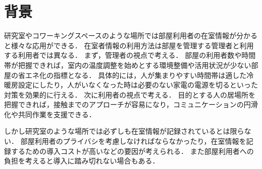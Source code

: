 





\section{背景}\label{1.1}

研究室やコワーキングスペースのような場所では部屋利用者の在室情報が分かると様々な応用ができる．
在室者情報の利用方法は部屋を管理する管理者と利用する利用者では異なる．
まず，管理者の視点で考える．
部屋の利用者数や時間帯が把握できれば，室内の温度調整を始めとする環境整備や活用状況が少ない部屋の省エネ化の指標となる．
具体的には，人が集まりやすい時間帯は適した冷暖房設定にしたり，人がいなくなった時は必要のない家電の電源を切るといった対策を効果的に行える．
次に利用者の視点で考える．
目的とする人の居場所を把握できれば，接触までのアプローチが容易になり，コミュニケーションの円滑化や共同作業を支援できる．

しかし研究室のような場所では必ずしも在室情報が記録されているとは限らない．
部屋利用者のプライバシを考慮しなければならなかったり\cite{privacy}，在室情報を記録するための導入コストが高いなど\cite{smartphone}の要因が考えられる．
また部屋利用者への負担を考えると導入に踏み切れない場合もある．




